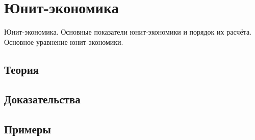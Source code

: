 
\section{Юнит-экономика}
\label{sec:2.6.18-unit-economics}

\begin{ticket}
Юнит-экономика. Основные показатели юнит-экономики и порядок их расчёта. Основное уравнение юнит-экономики.
\end{ticket}

\subsection*{Теория}

\subsection*{Доказательства}

\subsection*{Примеры}
